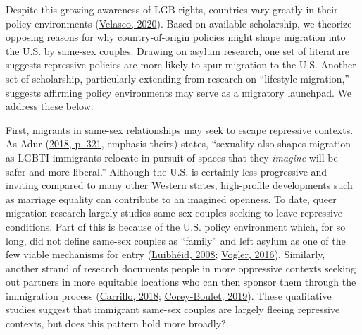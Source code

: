 \documentclass[
  11pt,
]{article}
\begin{document}
Despite this growing awareness of LGB rights, countries vary greatly in their policy environments (\protect\hyperlink{ref-velasco_2020}{Velasco, 2020}). Based on available scholarship, we theorize opposing reasons for why country-of-origin policies might shape migration into the U.S. by same-sex couples. Drawing on asylum research, one set of literature suggests repressive policies are more likely to spur migration to the U.S. Another set of scholarship, particularly extending from research on ``lifestyle migration,'' suggests affirming policy environments may serve as a migratory launchpad. We address these below.

First, migrants in same-sex relationships may seek to escape repressive contexts. As Adur (\protect\hyperlink{ref-adur_2018}{2018, p. 321}, emphasis theirs) states, ``sexuality also shapes migration as LGBTI immigrants relocate in pursuit of spaces that they \emph{imagine} will be safer and more liberal.'' Although the U.S. is certainly less progressive and inviting compared to many other Western states, high-profile developments such as marriage equality can contribute to an imagined openness. To date, queer migration research largely studies same-sex couples seeking to leave repressive conditions. Part of this is because of the U.S. policy environment which, for so long, did not define same-sex couples as ``family'' and left asylum as one of the few viable mechanisms for entry (\protect\hyperlink{ref-luibheid_2008}{Luibhéid, 2008}; \protect\hyperlink{ref-vogler_2016}{Vogler, 2016}). Similarly, another strand of research documents people in more oppressive contexts seeking out partners in more equitable locations who can then sponsor them through the immigration process (\protect\hyperlink{ref-carrillo_2018}{Carrillo, 2018}; \protect\hyperlink{ref-corey-boulet_2019}{Corey-Boulet, 2019}). These qualitative studies suggest that immigrant same-sex couples are largely fleeing repressive contexts, but does this pattern hold more broadly?
\end{document}
